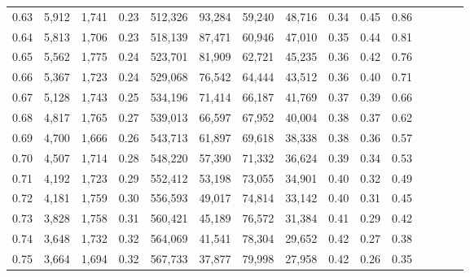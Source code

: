 \begin{tabular}{rrrcrrrrrrrrrrr}
0.63 &   5,912 &  1,741 &                                       0.23 &  512,326 &   93,284 &   59,240 &   48,716 &  0.34 &  0.45 &                         0.86 \\
0.64 &   5,813 &  1,706 &                                       0.23 &  518,139 &   87,471 &   60,946 &   47,010 &  0.35 &  0.44 &                         0.81 \\
0.65 &   5,562 &  1,775 &                                       0.24 &  523,701 &   81,909 &   62,721 &   45,235 &  0.36 &  0.42 &                         0.76 \\
0.66 &   5,367 &  1,723 &                                       0.24 &  529,068 &   76,542 &   64,444 &   43,512 &  0.36 &  0.40 &                         0.71 \\
0.67 &   5,128 &  1,743 &                                       0.25 &  534,196 &   71,414 &   66,187 &   41,769 &  0.37 &  0.39 &                         0.66 \\
0.68 &   4,817 &  1,765 &                                       0.27 &  539,013 &   66,597 &   67,952 &   40,004 &  0.38 &  0.37 &                         0.62 \\
0.69 &   4,700 &  1,666 &                                       0.26 &  543,713 &   61,897 &   69,618 &   38,338 &  0.38 &  0.36 &                         0.57 \\
0.70 &   4,507 &  1,714 &                                       0.28 &  548,220 &   57,390 &   71,332 &   36,624 &  0.39 &  0.34 &                         0.53 \\
0.71 &   4,192 &  1,723 &                                       0.29 &  552,412 &   53,198 &   73,055 &   34,901 &  0.40 &  0.32 &                         0.49 \\
0.72 &   4,181 &  1,759 &                                       0.30 &  556,593 &   49,017 &   74,814 &   33,142 &  0.40 &  0.31 &                         0.45 \\
0.73 &   3,828 &  1,758 &                                       0.31 &  560,421 &   45,189 &   76,572 &   31,384 &  0.41 &  0.29 &                         0.42 \\
0.74 &   3,648 &  1,732 &                                       0.32 &  564,069 &   41,541 &   78,304 &   29,652 &  0.42 &  0.27 &                         0.38 \\
0.75 &   3,664 &  1,694 &                                       0.32 &  567,733 &   37,877 &   79,998 &   27,958 &  0.42 &  0.26 &                         0.35 \\

\end{tabular}
